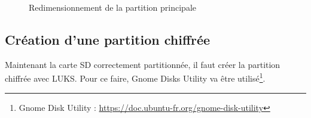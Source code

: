 \documentclass[11pt,a4paper,oneside]{report}
\begin{document}
\begin{figure}[H]
    \hfill
    \caption{Redimensionnement de la partition principale}
\end{figure}

\subsection{Création d'une partition chiffrée}

Maintenant la carte SD correctement partitionnée, il faut créer la partition chiffrée avec LUKS. Pour ce faire, Gnome Disks Utility va être utilisé\footnote{Gnome Disk Utility : \url{https://doc.ubuntu-fr.org/gnome-disk-utility}}.
\end{document}
